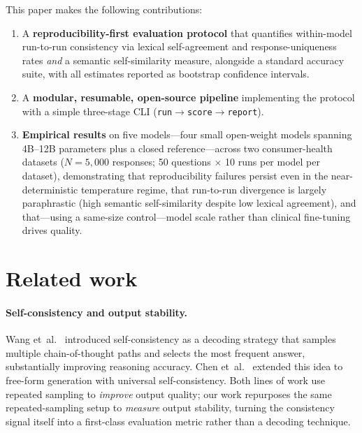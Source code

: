 \documentclass[10pt,letterpaper]{article}
\begin{document}
This paper makes the following contributions:
\begin{enumerate}
  \item A \textbf{reproducibility-first evaluation protocol} that
        quantifies within-model run-to-run consistency via lexical
        self-agreement and response-uniqueness rates \emph{and} a
        semantic self-similarity measure, alongside a standard accuracy
        suite, with all estimates reported as bootstrap confidence
        intervals.
  \item A \textbf{modular, resumable, open-source pipeline} implementing
        the protocol with a simple three-stage CLI
        (\texttt{run\;$\to$\;score\;$\to$\;report}).
  \item \textbf{Empirical results} on five models---four small
        open-weight models spanning 4B--12B parameters plus a closed
        reference---across two consumer-health datasets ($N{=}5{,}000$
        responses; 50 questions $\times$ 10 runs per model per dataset),
        demonstrating that reproducibility failures persist even in the
        near-deterministic temperature regime, that run-to-run
        divergence is largely paraphrastic (high semantic
        self-similarity despite low lexical agreement), and that---using
        a same-size control---model scale rather than clinical
        fine-tuning drives quality.
\end{enumerate}

\section*{Related work}
\label{sec:related}

\paragraph{Self-consistency and output stability.}
Wang et~al.~\cite{wang2022selfconsistency} introduced self-consistency
as a decoding strategy that samples multiple chain-of-thought paths
and selects the most frequent answer, substantially improving reasoning
accuracy. Chen et~al.~\cite{chen2023universal} extended this idea to
free-form generation with universal self-consistency.
Both lines of work use repeated sampling to \emph{improve} output quality;
our work repurposes the same repeated-sampling setup to \emph{measure}
output stability, turning the consistency signal itself into a
first-class evaluation metric rather than a decoding technique.
\end{document}
